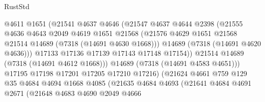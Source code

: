 \begin{lexlean}{RustStd}
\begin{coremodule}
                                @4611
                                @1651
                                (@21541
                                  @4637
                                  @4646
                                  (@21547
                                    @4637
                                    @4644
                                    @2398
                                    (@21555
                                      @4636
                                      @4643
                                      @2049
                                      @4619
                                      @1651
                                      @21568
                                      (@21576
                                        @4629
                                        @1651
                                        @21568
                                        @21514
                                        @14689
                                        (@7318 (@14691 @4630 @1668)))
                                      @14689
                                      (@7318 (@14691 @4620 @4636)))
                                    @17133
                                    @17136
                                    @17139
                                    @17143
                                    @17148
                                    @17154))
                                @21514
                                @14689
                                (@7318 (@14691 @4612 @1668)))
                              @14689
                              (@7318 (@14691 @4583 @4651)))
                            @17195
                            @17198
                            @17201
                            @17205
                            @17210
                            @17216)
                          (@21624
                            @4661
                            @759
                            @129
                            @35
                            @4684
                            @4694
                            @1668
                            @4085
                            (@21635
                              @4684
                              @4693
                              (@21641
                                @4684
                                @4691
                                @2671
                                (@21648
                                  @4683
                                  @4690
                                  @2049
                                  @4666

\end{coremodule}
\end{lexlean}
